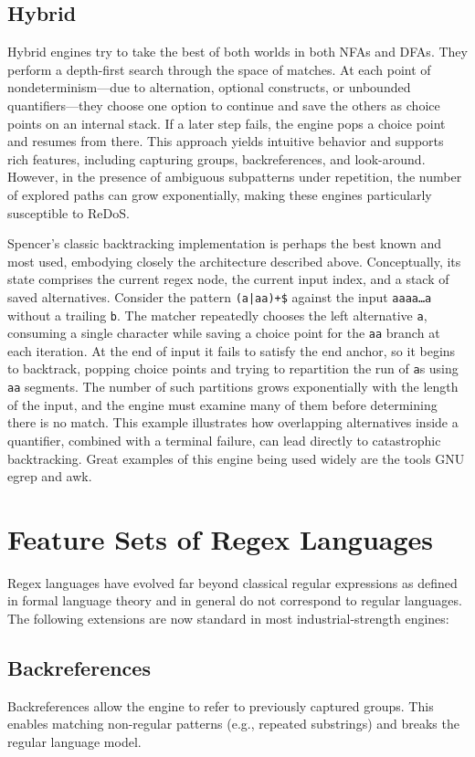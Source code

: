 \subsection{Hybrid}
Hybrid engines try to take the best of both worlds in both NFAs and DFAs. They perform a depth-first search through the space of matches. At each point of nondeterminism—due to alternation, optional constructs, or unbounded quantifiers—they choose one option to continue and save the others as choice points on an internal stack. If a later step fails, the engine pops a choice point and resumes from there. This approach yields intuitive behavior and supports rich features, including capturing groups, backreferences, and look-around. However, in the presence of ambiguous subpatterns under repetition, the number of explored paths can grow exponentially, making these engines particularly susceptible to ReDoS.

Spencer’s classic backtracking implementation is perhaps the best known and most used, embodying closely the architecture described above. Conceptually, its state comprises the current regex node, the current input index, and a stack of saved alternatives. Consider the pattern \texttt{(a|aa)+\$} against the input \texttt{aaaa\ldots a} without a trailing \texttt{b}. The matcher repeatedly chooses the left alternative \texttt{a}, consuming a single character while saving a choice point for the \texttt{aa} branch at each iteration. At the end of input it fails to satisfy the end anchor, so it begins to backtrack, popping choice points and trying to repartition the run of \texttt{a}s using \texttt{aa} segments. The number of such partitions grows exponentially with the length of the input, and the engine must examine many of them before determining there is no match. This example illustrates how overlapping alternatives inside a quantifier, combined with a terminal failure, can lead directly to catastrophic backtracking.
Great examples of this engine being used widely are the tools GNU egrep and awk.

\section{Feature Sets of Regex Languages}
Regex languages have evolved far beyond classical regular expressions as defined in formal language theory and in general do not correspond to regular languages. The following extensions are now standard in most industrial-strength engines:

\subsection{Backreferences}
Backreferences allow the engine to refer to previously captured groups. This enables matching non-regular patterns (e.g., repeated substrings) and breaks the regular language model.

